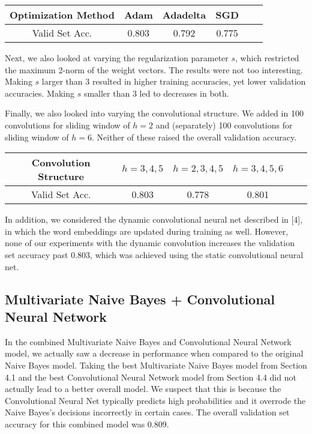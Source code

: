 \documentclass[11pt]{article}
\begin{document}
\begin{center}
\begin{tabular}{ c | c c c c c}
Optimization Method & Adam & Adadelta & SGD \\
\hline
Valid Set Acc. & 0.803 & 0.792 & 0.775
\end{tabular}
\end{center}

Next, we also looked at varying the regularization parameter $s$, which restricted the maximum 2-norm of the weight vectors.  The results were not too interesting.  Making $s$ larger than 3 resulted in higher training accuracies, yet lower validation accuracies.  Making $s$ smaller than 3 led to decreases in both.  

Finally, we also looked into varying the convolutional structure.  We added in 100 convolutions for sliding window of $h = 2$ and (separately) 100 convolutions for sliding window of $h = 6$.  Neither of these raised the overall validation accuracy. 

\begin{center}
\begin{tabular}{ c | c c c c c}
Convolution Structure & $h = 3, 4, 5$ & $h = 2, 3, 4, 5$ & $h = 3, 4, 5, 6$ \\
\hline
Valid Set Acc. & 0.803 & 0.778 & 0.801
\end{tabular}
\end{center}

In addition, we considered the dynamic convolutional neural net described in [4], in which the word embeddings are updated during training as well.  However, none of our experiments with the dynamic convolution increases the validation set accuracy past 0.803, which was achieved using the static convolutional neural net. 
   

\subsection{Multivariate Naive Bayes + Convolutional Neural Network}

In the combined Multivariate Naive Bayes and Convolutional Neural Network model, we actually saw a decrease in performance when compared to the original Naive Bayes model.  Taking the best Multivariate Naive Bayes model from Section 4.1 and the best Convolutional Neural Network model from Section 4.4 did not actually lead to a better overall model.  We suspect that this is because the Convolutional Neural Net typically predicts high probabilities and it overrode the Naive Bayes's decisions incorrectly in certain cases.  The overall validation set accuracy for this combined model was 0.809.
\end{document}
